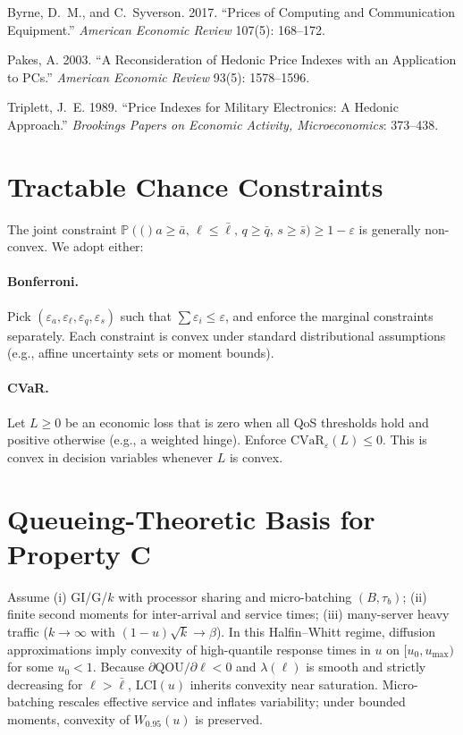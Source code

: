 \documentclass[12pt]{article}
\numberwithin{equation}{section}
\theoremstyle{definition}
\theoremstyle{plain}
\newcommand{\QOU}{\mathrm{QOU}}
\newcommand{\LCI}{\mathrm{LCI}}
\newcommand{\PP}[1]{\mathbb{P}\!\left(#1\right)}
\begin{document}
\begin{thebibliography}{}
Byrne, D.\ M., and C.\ Syverson. 2017. ``Prices of Computing and Communication Equipment.'' \emph{American Economic Review} 107(5): 168--172.

Pakes, A. 2003. ``A Reconsideration of Hedonic Price Indexes with an Application to PCs.'' \emph{American Economic Review} 93(5): 1578--1596.

Triplett, J.\ E. 1989. ``Price Indexes for Military Electronics: A Hedonic Approach.'' \emph{Brookings Papers on Economic Activity, Microeconomics}: 373--438.
\end{thebibliography}

\appendix

\section{Tractable Chance Constraints}\label{app:chance}
The joint constraint
\(
\PP(a\ge\bar a,\,\ell\le\bar\ell,\,q\ge\bar q,\,s\ge\bar s)\ge 1-\varepsilon
\)
is generally non-convex. We adopt either:

\paragraph{Bonferroni.}
Pick $(\varepsilon_a,\varepsilon_\ell,\varepsilon_q,\varepsilon_s)$ such that $\sum\varepsilon_i\le\varepsilon$, and enforce the marginal constraints separately. Each constraint is convex under standard distributional assumptions (e.g., affine uncertainty sets or moment bounds).

\paragraph{CVaR.}
Let $L\ge0$ be an economic loss that is zero when all QoS thresholds hold and positive otherwise (e.g., a weighted hinge). Enforce $\mathrm{CVaR}_{\varepsilon}(L)\le 0$. This is convex in decision variables whenever $L$ is convex.

\section{Queueing-Theoretic Basis for Property C}\label{app:queue}
Assume (i) GI/G/$k$ with processor sharing and micro-batching $(B,\tau_b)$; (ii) finite second moments for inter-arrival and service times; (iii) many-server heavy traffic ($k\to\infty$ with $(1-u)\sqrt{k}\to\beta$). In this Halfin–Whitt regime, diffusion approximations imply convexity of high-quantile response times in $u$ on $[u_0,u_{\max})$ for some $u_0<1$. Because $\partial \QOU/\partial \ell<0$ and $\lambda(\ell)$ is smooth and strictly decreasing for $\ell>\bar\ell$, $\LCI(u)$ inherits convexity near saturation. Micro-batching rescales effective service and inflates variability; under bounded moments, convexity of $W_{0.95}(u)$ is preserved.
\end{document}
